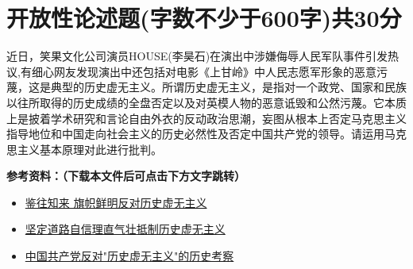 \documentclass[a4paper,12pt]{article}
\begin{document}
\section{开放性论述题(字数不少于600字)共30分}

近日，笑果文化公司演员HOUSE(李昊石)在演出中涉嫌侮辱人民军队事件引发热议,有细心网友发现演出中还包括对电影《上甘岭》中人民志愿军形象的恶意污蔑，这是典型的历史虚无主义。所谓历史虚无主义，是指对一个政党、国家和民族以往所取得的历史成绩的全盘否定以及对英模人物的恶意诋毁和公然污蔑。它本质上是披着学术研究和言论自由外衣的反动政治思潮，妄图从根本上否定马克思主义指导地位和中国走向社会主义的历史必然性及否定中国共产党的领导。请运用马克思主义基本原理对此进行批判。


\textbf{参考资料：（下载本文件后可点击下方文字跳转）}
\begin{itemize}
    \item \href{http://theory.people.com.cn/GB/n1/2017/0704/c40531-29380517.html}{鉴往知来 旗帜鲜明反对历史虚无主义}
    \item \href{https://www.dswxyjy.org.cn/n1/2018/0507/c398751-29969190.html}{坚定道路自信理直气壮抵制历史虚无主义}
    \item \href{https://www.dswxyjy.org.cn/n1/2017/0817/c398751-29476941.html}{中国共产党反对"历史虚无主义"的历史考察}
\end{itemize}
\end{document}
